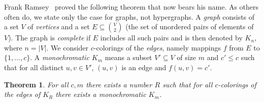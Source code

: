 \documentclass{article}
\theoremstyle{plain}
\newtheorem{thm}{Theorem}
\theoremstyle{definition}
\newtheorem{definition}{Definition}
\renewcommand{\leq}{\leqslant}  %
\newcommand{\Nat}{\mathbb{N}}   %
\begin{document}
Frank Ramsey~\cite{ramsey30} 
proved the following theorem that now bears his name.  
As others often do, we state only the case for graphs, not hypergraphs.
%
%
A \emph{graph} consists of a set $V$ of \emph{vertices} and a set 
$E \subseteq \binom{V}{2}$ (the set of unordered pairs of elements of $V$).
The graph is \emph{complete} if $E$ includes all such pairs and is then denoted by $K_n$, where $n = |V|$.  
We consider $c$-colorings of the \emph{edges}, namely mappings $f$ from $E$ to $\{1,\dots,c\}$.
A \emph{monochromatic $K_m$} means a subset $V' \subseteq V$ of size $m$ and $c' \leq c$ such that for all distinct $u,v \in V'$, $(u,v)$ is an edge and $f(u,v) = c'$.

\begin{thm} 
\label{ramsey}
For all $c,m$ there exists a number $R$
such that for all $c$-colorings of the edges of $K_R$
there exists a monochromatic $K_m$.
\end{thm}
\end{document}
